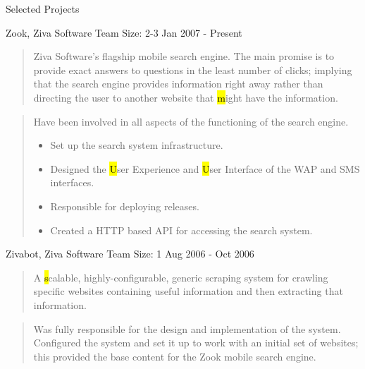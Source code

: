 \documentclass{resume}
\newcommand{\teamsize}{\hfill\sc\footnotesize Team Size: }
\begin{document}
\begin{category}{Selected Projects}{}
    \pagebreak

    \item {\topic Zook,} Ziva Software
        {\teamsize 2-3}
        {\period Jan 2007 - Present}
        \begin{quote}
            Ziva Software's flagship mobile search engine. The main promise is
            to provide exact answers to questions in the least number of
            clicks; implying that the search engine provides information right
            away rather than directing the user to another website that {\hl
            might} have the information.
        \end{quote}
        \begin{quote}
            Have been involved in all aspects of the functioning of the search
            engine.
            \begin{itemize}
                \item Set up the search system infrastructure.
                \item Designed the {\hl User Experience} and {\hl User
                    Interface} of the WAP and SMS interfaces.
                \item Responsible for deploying releases.
                \item Created a HTTP based API for accessing the search system.
            \end{itemize}
        \end{quote}

    \item {\topic Zivabot,} Ziva Software
        {\teamsize 1}
        {\period Aug 2006 - Oct 2006}
        \begin{quote}
            A {\hl scalable, highly-configurable, generic scraping system} for
            crawling specific websites containing useful information and then
            extracting that information.
        \end{quote}
        \begin{quote}
            Was fully responsible for the design and implementation of the
            system. Configured the system and set it up to work with an initial
            set of websites; this provided the base content for the Zook mobile
            search engine.
        \end{quote}


\end{category}
\end{document}
